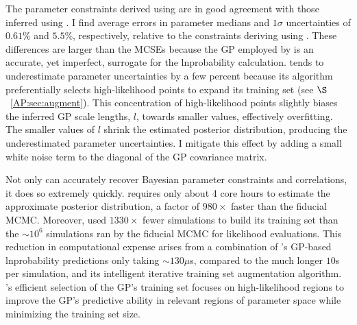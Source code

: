 The parameter constraints derived using \approxposterior are in good agreement with those inferred using \emcee. I find average errors in parameter medians and $1\sigma$ uncertainties of $0.61\%$ and $5.5\%$, respectively, relative to the constraints deriving using \emcee. These differences are larger than the MCSEs because the GP employed by \approxposterior is an accurate, yet imperfect, surrogate for the lnprobability calculation. \approxposterior tends to underestimate parameter uncertainties by a few percent because its algorithm preferentially selects high-likelihood points to expand its training set (see $\S$~\ref{AP:sec:augment}). This concentration of high-likelihood points slightly biases the inferred GP scale lengths, $l$, towards smaller values, effectively overfitting. The smaller values of $l$ shrink the estimated posterior distribution, producing the underestimated parameter uncertainties. I mitigate this effect by adding a small white noise term to the diagonal of the GP covariance matrix.

Not only can \approxposterior accurately recover Bayesian parameter constraints and correlations, it does so extremely quickly. \approxposterior requires only about 4 core hours to estimate the approximate posterior distribution, a factor of $980\times$ faster than the fiducial MCMC. Moreover, \approxposterior used $1330\times$ fewer \vplanet simulations to build its training set than the ${\sim}10^6$ simulations ran by the fiducial MCMC for likelihood evaluations. This reduction in computational expense arises from a combination of \approxposterior's GP-based lnprobability predictions only taking ${\sim}130\mu$s, compared to the much longer $10$s per \vplanet simulation, and its intelligent iterative training set augmentation algorithm. \approxposterior's efficient selection of the GP's training set focuses on high-likelihood regions to improve the GP's predictive ability in relevant regions of parameter space while minimizing the training set size.

